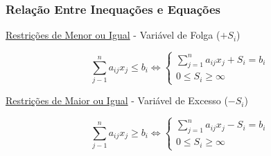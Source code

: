 \begin{frame}
	\frametitle{Relação Entre Inequações e Equações}
	
	{
	\underline{Restrições de Menor ou Igual} - Variável de Folga ($+S_i$)
	\begin{mdframed}[backgroundcolor=blue!20]
		\begin{equation*}
			\sum_{j-1}^{n}a_{ij}x_j \le b_i \Leftrightarrow
			\left\{ \begin{matrix}
						\sum_{j=1}^{n}a_{ij}x_j + S_i = b_i \\
						0 \le S_i \ge \infty
					\end{matrix}  
			\right.
		\end{equation*}
	\end{mdframed}	
	}
	
	{
	\vspace{0.5cm}
	\underline{Restrições de Maior ou Igual} - Variável de Excesso ($-S_i$)
	\begin{mdframed}[backgroundcolor=red!20]
		\begin{equation*}
			\sum_{j-1}^{n}a_{ij}x_j \ge b_i \Leftrightarrow
			\left\{ \begin{matrix}
						\sum_{j=1}^{n}a_{ij}x_j - S_i = b_i \\
						0 \le S_i \ge \infty
					\end{matrix}  
			\right.
		\end{equation*}
	\end{mdframed}
	}
\end{frame}

